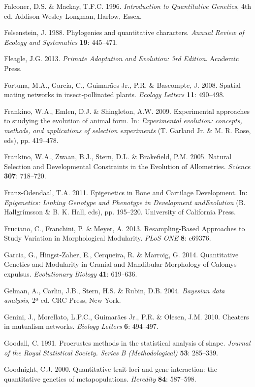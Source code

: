 \documentclass[12pt,twoside]{report}
\begin{document}
Falconer, D.S. \& Mackay, T.F.C. 1996. \emph{Introduction to
Quantitative Genetics}, 4th ed. Addison Wesley Longman, Harlow, Essex.

Felsenstein, J. 1988. Phylogenies and quantitative characters.
\emph{Annual Review of Ecology and Systematics} \textbf{19}: 445--471.

Fleagle, J.G. 2013. \emph{Primate Adaptation and Evolution: 3rd
Edition}. Academic Press.

Fortuna, M.A., García, C., Guimarães Jr., P.R. \& Bascompte, J. 2008.
Spatial mating networks in insect-pollinated plants. \emph{Ecology
Letters} \textbf{11}: 490--498.

Frankino, W.A., Emlen, D.J. \& Shingleton, A.W. 2009. Experimental
approaches to studying the evolution of animal form. In:
\emph{Experimental evolution: concepts, methods, and applications of
selection experiments} (T. Garland Jr. \& M. R. Rose, eds), pp.
419--478.

Frankino, W.A., Zwaan, B.J., Stern, D.L. \& Brakefield, P.M. 2005.
Natural Selection and Developmental Constraints in the Evolution of
Allometries. \emph{Science} \textbf{307}: 718--720.

Franz-Odendaal, T.A. 2011. Epigenetics in Bone and Cartilage
Development. In: \emph{Epigenetics: Linking Genotype and Phenotype in
Development andEvolution} (B. Hallgrímsson \& B. K. Hall, eds), pp.
195--220. University of California Press.

Fruciano, C., Franchini, P. \& Meyer, A. 2013. Resampling-Based
Approaches to Study Variation in Morphological Modularity. \emph{PLoS
ONE} \textbf{8}: e69376.

Garcia, G., Hingst-Zaher, E., Cerqueira, R. \& Marroig, G. 2014.
Quantitative Genetics and Modularity in Cranial and Mandibular
Morphology of Calomys expulsus. \emph{Evolutionary Biology} \textbf{41}:
619--636.

Gelman, A., Carlin, J.B., Stern, H.S. \& Rubin, D.B. 2004.
\emph{Bayesian data analysis}, 2ª ed. CRC Press, New York.

Genini, J., Morellato, L.P.C., Guimarães Jr., P.R. \& Olesen, J.M. 2010.
Cheaters in mutualism networks. \emph{Biology Letters} \textbf{6}:
494--497.

Goodall, C. 1991. Procrustes methods in the statistical analysis of
shape. \emph{Journal of the Royal Statistical Society. Series B
(Methodological)} \textbf{53}: 285--339.

Goodnight, C.J. 2000. Quantitative trait loci and gene interaction: the
quantitative genetics of metapopulations. \emph{Heredity} \textbf{84}:
587--598.
\end{document}
